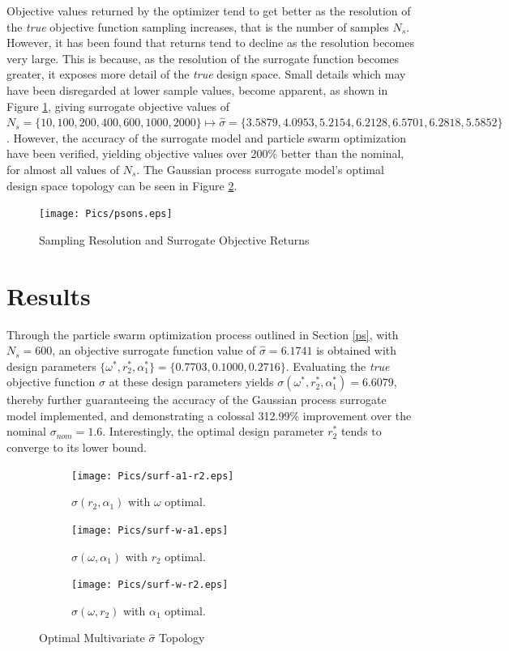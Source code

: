 \documentclass{article}
\begin{document}
Objective values returned by the optimizer tend to get better as the resolution of the \textit{true} objective function sampling increases, that is the number of samples $N_s$. However, it has been found that returns tend to decline as the resolution becomes very large. This is because, as the resolution of the surrogate function becomes greater, it exposes more detail of the \textit{true} design space. Small details which may have been disregarded at lower sample values, become apparent, as shown in Figure \ref{fig:psosamp}, giving surrogate objective values of $N_s = \{ 10,100,200,400,600,1000,2000\} \mapsto \hat{\sigma} = \{ 3.5879,4.0953,5.2154,6.2128,6.5701,6.2818,5.5852 \}$. However, the accuracy of the surrogate model and particle swarm optimization have been verified, yielding objective values over 200\% better than the nominal, for almost all values of $N_s$. The Gaussian process surrogate model's optimal design space topology can be seen in Figure \ref{fig:topopt}.

\begin{figure}
    \centering
    \texttt{[image: Pics/psons.eps]}
    \caption{Sampling Resolution and Surrogate Objective Returns}
    \label{fig:psosamp}
\end{figure}

\section{Results}
Through the particle swarm optimization process outlined in Section \ref{ps}, with $N_s=600$, an objective surrogate function value of $\hat{\sigma} = 6.1741$ is obtained with design parameters $\{\omega^*,r_2^*,\alpha_1^*\} = \{0.7703,0.1000,0.2716\}$. Evaluating the \textit{true} objective function $\sigma$ at these design parameters yields $\sigma(\omega^*,r_2^*,\alpha_1^*) = 6.6079$, thereby further guaranteeing the accuracy of the Gaussian process surrogate model implemented, and demonstrating a colossal 312.99\% improvement over the nominal $\sigma_{nom} = 1.6$. Interestingly, the optimal design parameter $r_2^*$ tends to converge to its lower bound.

\begin{figure}

\begin{subfigure}{0.49\textwidth}
\texttt{[image: Pics/surf-a1-r2.eps]} 
\caption{$\hat{\sigma}(r_2,\alpha_1)$ with $\omega$ optimal.}
\end{subfigure}

\begin{subfigure}{0.49\textwidth}
\texttt{[image: Pics/surf-w-a1.eps]}
\caption{$\hat{\sigma}(\omega,\alpha_1)$ with $r_2$ optimal.}
\end{subfigure}

\begin{subfigure}{0.49\textwidth}
\texttt{[image: Pics/surf-w-r2.eps]}
\caption{$\hat{\sigma}(\omega,r_2)$ with $\alpha_1$ optimal.}
\end{subfigure}

\caption{Optimal Multivariate $\hat{\sigma}$ Topology}
\label{fig:topopt}
\end{figure}
\end{document}

